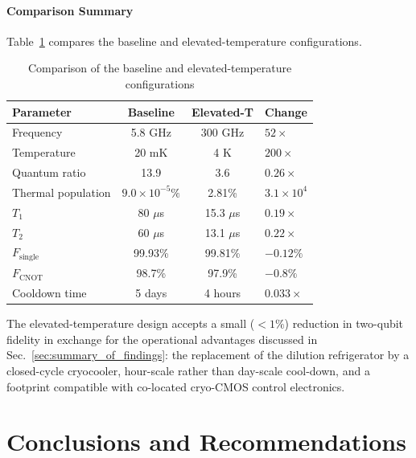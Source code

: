 \subsection{Comparison Summary}

Table~\ref{tab:baseline_comparison} compares the baseline and elevated-temperature configurations.

\begin{table}[h]
\centering
\caption{Comparison of the baseline and elevated-temperature configurations}
\label{tab:baseline_comparison}
\begin{tabular}{@{}lccl@{}}
\toprule
Parameter & Baseline & Elevated-T & Change \\
\midrule
Frequency & 5.8 GHz & 300 GHz & $52\times$ \\
Temperature & 20 mK & 4 K & $200\times$ \\
Quantum ratio & 13.9 & 3.6 & $0.26\times$ \\
Thermal population & $9.0\times10^{-5}\%$ & 2.81\% & $3.1\times10^{4}$ \\
\midrule
$T_1$ & 80 $\mu$s & 15.3 $\mu$s & $0.19\times$ \\
$T_2$ & 60 $\mu$s & 13.1 $\mu$s & $0.22\times$ \\
\midrule
$F_{\text{single}}$ & 99.93\% & 99.81\% & $-0.12\%$ \\
$F_{\text{CNOT}}$ & 98.7\% & 97.9\% & $-0.8\%$ \\
\midrule
Cooldown time & 5 days & 4 hours & $0.033\times$ \\
\bottomrule
\end{tabular}
\end{table}

The elevated-temperature design accepts a small ($< 1\%$) reduction in two-qubit fidelity in exchange for the operational advantages discussed in Sec.~\ref{sec:summary_of_findings}: the replacement of the dilution refrigerator by a closed-cycle cryocooler, hour-scale rather than day-scale cool-down, and a footprint compatible with co-located cryo-CMOS control electronics.


\part{Conclusions and Recommendations}
\label{sec:conclusions}

